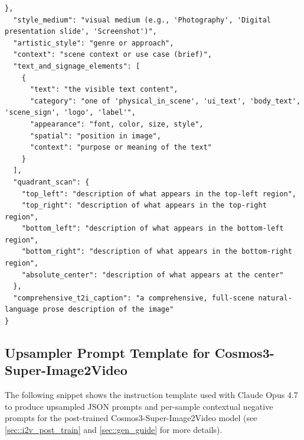 \begin{tcolorbox}
\begin{Verbatim}[breaklines=true,breakanywhere=true,fontsize=\scriptsize]
  },
  "style_medium": "visual medium (e.g., 'Photography', 'Digital presentation slide', 'Screenshot')",
  "artistic_style": "genre or approach",
  "context": "scene context or use case (brief)",
  "text_and_signage_elements": [
    {
      "text": "the visible text content",
      "category": "one of 'physical_in_scene', 'ui_text', 'body_text', 'scene_sign', 'logo', 'label'",
      "appearance": "font, color, size, style",
      "spatial": "position in image",
      "context": "purpose or meaning of the text"
    }
  ],
  "quadrant_scan": {
    "top_left": "description of what appears in the top-left region",
    "top_right": "description of what appears in the top-right region",
    "bottom_left": "description of what appears in the bottom-left region",
    "bottom_right": "description of what appears in the bottom-right region",
    "absolute_center": "description of what appears at the center"
  },
  "comprehensive_t2i_caption": "a comprehensive, full-scene natural-language prose description of the image"
}
\end{Verbatim}
\end{tcolorbox}


\subsection{Upsampler Prompt Template for Cosmos3-Super-Image2Video}
\label{appendix:sft_i2v_upsampler_prompt}

The following snippet shows the instruction template used with Claude Opus 4.7 to produce upsampled JSON prompts and per-sample contextual negative prompts for the post-trained Cosmos3-Super-Image2Video model (see \cref{sec::i2v_post_train} and \cref{sec::gen_guide} for more details).

